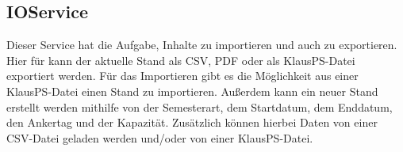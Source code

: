 \subsection{IOService}
Dieser Service hat die Aufgabe, Inhalte zu importieren und auch zu exportieren.
Hier für kann der aktuelle Stand als CSV, PDF oder als KlausPS-Datei exportiert werden.
\newline
Für das Importieren gibt es die Möglichkeit aus einer KlausPS-Datei einen Stand zu importieren.
Außerdem kann ein neuer Stand erstellt werden mithilfe von der Semesterart, dem Startdatum, dem Enddatum, den Ankertag und der Kapazität.
Zusätzlich können hierbei Daten von einer CSV-Datei geladen werden und/oder von einer KlausPS-Datei.
